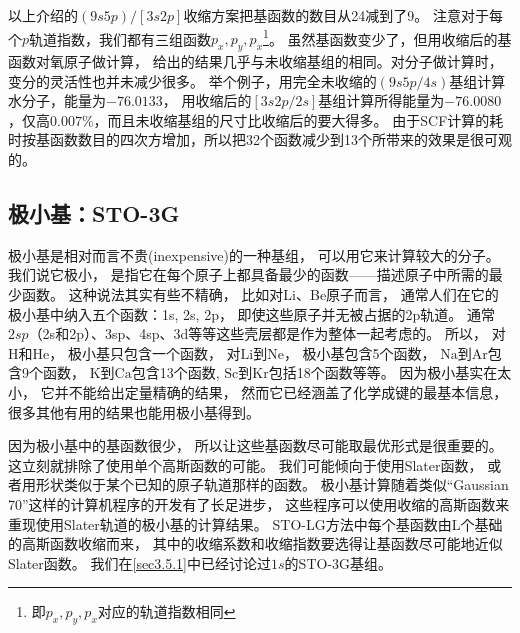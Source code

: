 以上介绍的$(9s5p)/[3s2p]$收缩方案把基函数的数目从24减到了9。
注意对于每个$p$轨道指数，我们都有三组函数$p_x,p_y,p_x$\footnote{
	即$p_x,p_y,p_x$对应的轨道指数相同
}。
虽然基函数变少了，但用收缩后的基函数对氧原子做计算，
给出的结果几乎与未收缩基组的相同。对分子做计算时，变分的灵活性也并未减少很多。
举个例子，用完全未收缩的$(9s5p/4s)$基组计算水分子，能量为$-76.0133$，
用收缩后的$[3s2p/2s]$基组计算所得能量为$-76.0080$，仅高$0.007\%$，而且未收缩基组的尺寸比收缩后的要大得多。
由于SCF计算的耗时按基函数数目的四次方增加，所以把32个函数减少到13个所带来的效果是很可观的。

\subsection{极小基：STO-3G}
极小基是相对而言不贵(inexpensive)的一种基组，
可以用它来计算较大的分子。
我们说它极小，
是指它在每个原子上都具备最少的函数——描述原子中所需的最少函数。
这种说法其实有些不精确，
比如对Li、Be原子而言，
通常人们在它的极小基中纳入五个函数：1s, 2s, 2p，
即使这些原子并无被占据的2p轨道。
通常$2sp$（2s和2p）、3sp、4sp、3d等等这些壳层都是作为整体一起考虑的。
所以，
对$\mathrm{H}$和$\mathrm{He}$，
极小基只包含一个函数，
对$\mathrm{Li}$到$\mathrm{Ne}$，
极小基包含5个函数，
$\mathrm{Na}$到$\mathrm{Ar}$包含9个函数，
$\mathrm{K}$到$\mathrm{Ca}$包含13个函数,
$\mathrm{Sc}$到$\mathrm{Kr}$包括18个函数等等。
因为极小基实在太小，
它并不能给出定量精确的结果，
然而它已经涵盖了化学成键的最基本信息，
很多其他有用的结果也能用极小基得到。


因为极小基中的基函数很少，
所以让这些基函数尽可能取最优形式是很重要的。
这立刻就排除了使用单个高斯函数的可能。
我们可能倾向于使用Slater函数，
或者用形状类似于某个已知的原子轨道那样的函数。
极小基计算随着类似“Gaussian 70”这样的计算机程序的开发有了长足进步，
这些程序可以使用收缩的高斯函数来重现使用Slater轨道的极小基的计算结果。
STO-LG方法中每个基函数由L个基础的高斯函数收缩而来，
其中的收缩系数和收缩指数要选得让基函数尽可能地近似Slater函数。
我们在\autoref{sec3.5.1}中已经讨论过$1s$的STO-3G基组。


